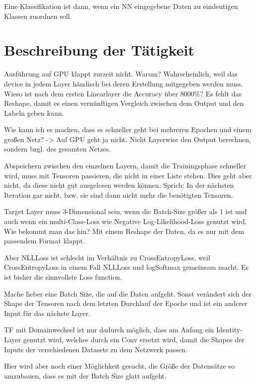 Eine Klassifikation ist dann, wenn ein NN eingegebene Daten zu 
    eindeutigen Klassen zuordnen soll.

\section{Beschreibung der Tätigkeit}
    
    Ausführung auf GPU klappt zurzeit nicht. Warum? Wahrscheinlich, 
    weil das device in jedem Layer händisch bei deren Erstellung mitgegeben 
    werden muss.
    Wieso ist nach dem ersten Linearlayer die Accuracy über 8000\%?
    Es fehlt das Reshape, damit es einen vernünftigen Vergleich 
    zwischen dem Output und den Labeln geben kann.
    
    Wie kann ich es machen, dass es schneller geht bei mehreren Epochen 
    und einem großen Netz? -> Auf GPU geht ja nicht.
    Nicht Layerwise den Output berechnen, sondern bzgl. des gesamten Netzes.

    Abspeichern zwischen den einzelnen Layern, damit die Trainingsphase 
    schneller wird, muss mit Tensoren passieren, die nicht in einer Liste 
    stehen. Dies geht aber nicht, da diese nicht gut ausgelesen werden können. 
    Sprich: In der nächsten Iteration gar nicht, bzw. sie sind dann nicht 
    mehr die benötigten Tensoren.

    Target Layer muss 3-Dimensional sein, wenn die Batch-Size größer als 1 
    ist und auch wenn ein multi-Class-Loss wie Negative Log-Likelihood-Loss 
    genutzt wird. Wie bekommt man das hin?
    Mit einem Reshape der Daten, da es nur mit dem passendem Format klappt. 

    Aber NLLLoss ist schlecht im Verhältnis zu CrossEntropyLoss, weil 
    CrossEntropyLoss in einem Fall NLLLoss und logSoftmax gemeinsam macht.
    Es ist bisher die sinnvollste Loss function.

    Mache lieber eine Batch Size, die auf die Daten aufgeht. Sonst verändert 
    sich der Shape der Tensoren nach dem letzten Durchlauf der Epoche und ist 
    ein anderer Input für das nächste Layer.

    TF mit Domainwechsel ist nur dadurch möglich, dass am Anfang ein 
    Identity-Layer genutzt wird, welches durch ein Conv ersetzt wird, 
    damit die Shapes der Inputs der verschiedenen Datasets zu dem 
    Netzwerk passen.

    Hier wird aber noch einer Möglichkeit gesucht, die Größe der 
    Datensätze so umzubauen, dass es mit der Batch Size glatt aufgeht.

